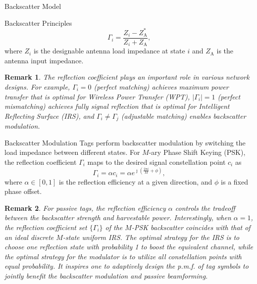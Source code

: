 \documentclass[journal]{IEEEtran}
\newtheorem{remark}{Remark}
\begin{document}
\begin{section}{Backscatter Model}
\begin{subsection}{Backscatter Principles}
			\begin{equation}
				\Gamma_i = \frac{Z_i - Z_{\mathrm{A}}^*}{Z_i + Z_{\mathrm{A}}},
				\label{eq:reflection_coefficient}
			\end{equation}
			where $Z_i$ is the designable antenna load impedance at state $i$ and $Z_{\mathrm{A}}$ is the antenna input impedance.
			\begin{remark}
				The reflection coefficient plays an important role in various network designs. For example, $\Gamma_i = 0$ (perfect matching) achieves maximum power transfer that is optimal for Wireless Power Transfer (WPT), $\lvert \Gamma_i \rvert = 1$ (perfect mismatching) achieves fully signal reflection that is optimal for Intelligent Reflecting Surface (IRS), and $\Gamma_i \ne \Gamma_j$ (adjustable matching) enables backscatter modulation.
			\end{remark}
		\end{subsection}

		\begin{subsection}{Backscatter Modulation}
			Tags perform backscatter modulation by switching the load impedance between different states. For $M$-ary Phase Shift Keying (PSK), the reflection coefficient $\Gamma_i$ maps to the desired signal constellation point $c_i$ as \cite{Thomas2012a}
			\begin{equation}
				\Gamma_i = \alpha c_i = \alpha e^{\jmath \left(\frac{2 \pi i}{M} + \phi\right)},
				\label{eq:backscatter_modulation}
			\end{equation}
			where $\alpha \in [0,1]$ is the reflection efficiency at a given direction, and $\phi$ is a fixed phase offset.
			\begin{remark}
				For passive tags, the reflection efficiency $\alpha$ controls the tradeoff between the backscatter strength and harvestable power. Interestingly, when $\alpha = 1$, the reflection coefficient set $\{\Gamma_i\}$ of the $M$-PSK backscatter coincides with that of an ideal discrete $M$-state uniform IRS. The optimal strategy for the IRS is to choose one reflection state with probability \num{1} to boost the equivalent channel, while the optimal strategy for the modulator is to utilize all constellation points with equal probability. It inspires one to adaptively design the p.m.f. of tag symbols to jointly benefit the backscatter modulation and passive beamforming.
			\end{remark}
		\end{subsection}
	\end{section}
\end{document}
